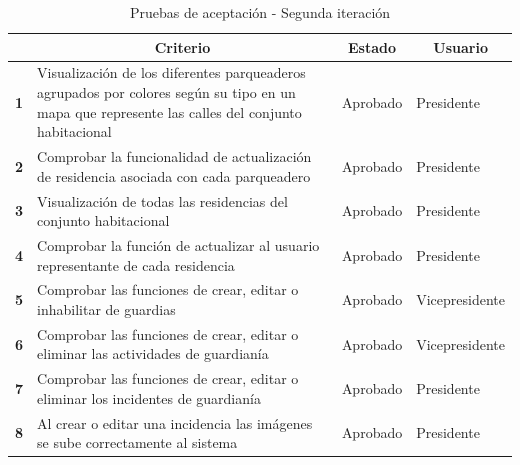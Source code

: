 \begin{footnotesize}
\begin{spacing}{1}
    \begin{center}


    \renewcommand*{\arraystretch}{1.4}
    \begin{longtable}{ |>{\bfseries}l|p{}|l|l| }
        \caption{Pruebas de aceptación - Segunda iteración}\\
        \hline
        \multicolumn{1}{|c|}{ \textbf{N.}} & \multicolumn{1}{c|}{\textbf{Criterio}} & \multicolumn{1}{c|}{ \textbf{Estado}} & \multicolumn{1}{c|}{ \textbf{Usuario}}\\
        \hline
        1 & Visualización de los diferentes parqueaderos agrupados por colores según su tipo en un mapa que represente las calles del conjunto habitacional & Aprobado & Presidente\\
        \hline
        2 & Comprobar la funcionalidad de actualización de residencia asociada con cada parqueadero & Aprobado & Presidente\\
        \hline
        3 & Visualización de todas las residencias del conjunto habitacional & Aprobado & Presidente\\
        \hline
        4 & Comprobar la función de actualizar al usuario representante de cada residencia & Aprobado & Presidente\\
        \hline
        5 & Comprobar las funciones de crear, editar o inhabilitar de guardias & Aprobado & Vicepresidente\\
        \hline
        6 & Comprobar las funciones de crear, editar o eliminar las actividades de guardianía & Aprobado & Vicepresidente\\
        \hline
        7 & Comprobar las funciones de crear, editar o eliminar los incidentes de guardianía & Aprobado & Presidente\\
        \hline
        8 & Al crear o editar una incidencia las imágenes se sube correctamente al sistema & Aprobado & Presidente\\


\end{longtable}
\end{center}
\end{spacing}
\end{footnotesize}
